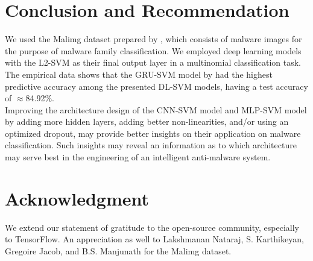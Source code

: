 \documentclass[sigconf]{acmart}
\begin{document}
\section{Conclusion and Recommendation}
We used the Malimg dataset prepared by \cite{nataraj2011malware}, which consists of malware images for the purpose of malware family classification. We employed deep learning models with the L2-SVM as their final output layer in a multinomial classification task. The empirical data shows that the GRU-SVM model by \cite{agarap2017neural} had the highest predictive accuracy among the presented DL-SVM models, having a test accuracy of $\approx$84.92\%.\\
\indent	Improving the architecture design of the CNN-SVM model and MLP-SVM model by adding more hidden layers, adding better non-linearities, and/or using an optimized dropout, may provide better insights on their application on malware classification. Such insights may reveal an information as to which architecture may serve best in the engineering of an intelligent anti-malware system.

\section{Acknowledgment}
We extend our statement of gratitude to the open-source community, especially to TensorFlow. An appreciation as well to Lakshmanan Nataraj, S. Karthikeyan, Gregoire Jacob, and B.S. Manjunath for the Malimg dataset\cite{nataraj2011malware}. 

 
\end{document}
